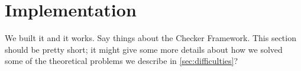 \section{Implementation}
\label{sec:implementation}

We built it and it works. Say things about the Checker Framework. This section
should be pretty short; it might give some more details about how we solved
some of the theoretical problems we describe in \cref{sec:difficulties}?

